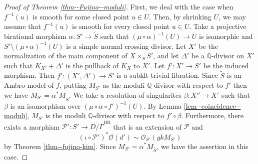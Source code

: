 \documentclass[12pt,twoside]{amsart}
\theoremstyle{definition}
\begin{document}
\begin{proof}[Proof of Theorem \ref{thm--Fujino--moduli}]
First, we deal with the case when $f^{-1}(u)$ is smooth for some closed point $u\in U$.
Then, by shrinking $U$, we may assume that $f^{-1}(u)$ is smooth for every closed point $u\in U$.
Take a projective birational morphism $\alpha\colon S'\to \tilde{S}$ such that $(\mu\circ\alpha)^{-1}(U)\to U$ is isomorphic and $S'\setminus(\mu\circ\alpha)^{-1}(U)$ is a simple normal crossing divisor.
Let $X'$ be the normalization of the main component of $X\times_SS'$, and let $\Delta'$ be a $\mathbb{Q}$-divisor on $X'$ such that 
$K_{X'}+\Delta'$ is the pullback of $K_X$ to $X'$.
Let $f' \colon X'\to S'$ be the induced morphism. 
Then $f' \colon(X',\Delta')\to S'$ is a subklt-trivial fibration. 
Since $\tilde{S}$ is an Ambro model of $f$, putting $M_{S'}$ as the moduli $\mathbb{Q}$-divisor with respect to $f'$ then we have $M_{S'}=\alpha^*M_{\tilde{S}}$. 
We take a resolution of singularites $\beta\colon X''\to X'$ such that $\beta$ is an isomorphism over $(\mu\circ\alpha\circ f')^{-1}(U)$.
By Lemma \ref{lem--coincidence--moduli}, $M_{S'}$ is the moduli $\mathbb{Q}$-divisor with respect to $ f'\circ\beta$.
Furthermore, there exists a morphism $\mathcal{P}'\colon S'\to \overline{D/\Gamma}^{\mathrm{BB}}$ that is an extension of $\mathcal{P}$ and 
\[
(\iota\circ\mathcal{P}')^*\mathcal{O}(d')\sim \mathcal{O}_{S'}(gkM_{S'})
\]
by Theorem \ref{thm--fujino-kim}.
Since $M_{S'}=\alpha^*M_{\tilde{S}}$, we have the assertion in this case.


\end{proof}
\end{document}
